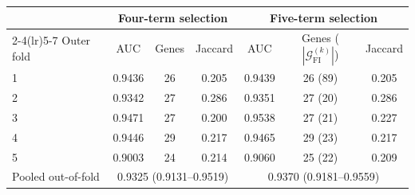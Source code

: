 \begin{tabular}{lcccccc}
\toprule
 & \multicolumn{3}{c}{Four-term selection} & \multicolumn{3}{c}{Five-term selection} \\
\cmidrule(lr){2-4}\cmidrule(lr){5-7}
Outer fold & AUC & Genes & Jaccard & AUC & Genes ($|\mathcal{G}^{(k)}_{\mathrm{FI}}|$) & Jaccard \\
\midrule
1 & 0.9436 & 26 & 0.205 & 0.9439 & 26 (89) & 0.205 \\
2 & 0.9342 & 27 & 0.286 & 0.9351 & 27 (20) & 0.286 \\
3 & 0.9471 & 27 & 0.200 & 0.9538 & 27 (21) & 0.227 \\
4 & 0.9446 & 29 & 0.217 & 0.9465 & 29 (23) & 0.217 \\
5 & 0.9003 & 24 & 0.214 & 0.9060 & 25 (22) & 0.209 \\
\midrule
Pooled out-of-fold & \multicolumn{3}{c}{0.9325 (0.9131--0.9519)} & \multicolumn{3}{c}{0.9370 (0.9181--0.9559)} \\
\bottomrule
\end{tabular}
